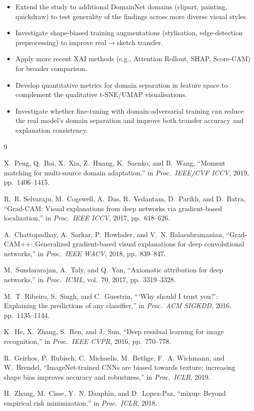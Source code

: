 \documentclass[12pt, a4paper]{article}
\begin{document}
\begin{itemize}[leftmargin=*]
    \item Extend the study to additional DomainNet domains (clipart, painting,
          quickdraw) to test generality of the findings across more diverse
          visual styles.
    \item Investigate shape-biased training augmentations (stylisation,
          edge-detection preprocessing) to improve real$\to$sketch transfer.
    \item Apply more recent XAI methods (e.g., Attention Rollout, SHAP,
          Score-CAM) for broader comparison.
    \item Develop quantitative metrics for domain separation in feature space
          to complement the qualitative t-SNE/UMAP visualisations.
    \item Investigate whether fine-tuning with domain-adversarial training
          can reduce the real model's domain separation and improve both
          transfer accuracy and explanation consistency.
\end{itemize}


\begin{thebibliography}{9}

X.~Peng, Q.~Bai, X.~Xia, Z.~Huang, K.~Saenko, and B.~Wang,
``Moment matching for multi-source domain adaptation,''
in \emph{Proc.\ IEEE/CVF ICCV}, 2019, pp.~1406--1415.

R.~R. Selvaraju, M.~Cogswell, A.~Das, R.~Vedantam, D.~Parikh, and D.~Batra,
``Grad-CAM: Visual explanations from deep networks via gradient-based
localization,''
in \emph{Proc.\ IEEE ICCV}, 2017, pp.~618--626.

A.~Chattopadhay, A.~Sarkar, P.~Howlader, and V.~N. Balasubramanian,
``Grad-CAM++: Generalized gradient-based visual explanations for deep
convolutional networks,''
in \emph{Proc.\ IEEE WACV}, 2018, pp.~839--847.

M.~Sundararajan, A.~Taly, and Q.~Yan,
``Axiomatic attribution for deep networks,''
in \emph{Proc.\ ICML}, vol.~70, 2017, pp.~3319--3328.

M.~T. Ribeiro, S.~Singh, and C.~Guestrin,
``{`Why should I trust you?'}: Explaining the predictions of any classifier,''
in \emph{Proc.\ ACM SIGKDD}, 2016, pp.~1135--1144.

K.~He, X.~Zhang, S.~Ren, and J.~Sun,
``Deep residual learning for image recognition,''
in \emph{Proc.\ IEEE CVPR}, 2016, pp.~770--778.

R.~Geirhos, P.~Rubisch, C.~Michaelis, M.~Bethge, F.~A. Wichmann, and
W.~Brendel,
``ImageNet-trained {CNN}s are biased towards texture; increasing shape bias
improves accuracy and robustness,''
in \emph{Proc.\ ICLR}, 2019.

H.~Zhang, M.~Cisse, Y.~N. Dauphin, and D.~Lopez-Paz,
``mixup: Beyond empirical risk minimization,''
in \emph{Proc.\ ICLR}, 2018.

\end{thebibliography}
\end{document}
